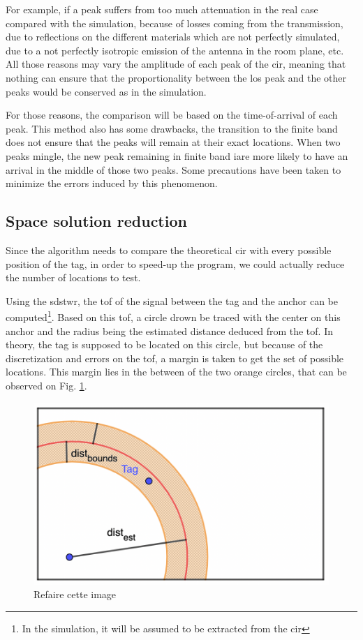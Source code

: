For example, if a peak suffers from too much attenuation in the real case compared with the simulation, because of losses coming from the transmission, due to reflections on the different materials which are not perfectly simulated, due to a not perfectly isotropic emission of the antenna in the room plane, etc. All those reasons may vary the amplitude of each peak of the \gls{cir}, meaning that nothing can ensure that the proportionality between the \gls{los} peak and the other peaks would be conserved as in the simulation.
\vspace{2mm}

For those reasons, the comparison will be based on the time-of-arrival of each peak. This method also has some drawbacks, the transition to the finite band does not ensure that the peaks will remain at their exact locations. When two peaks mingle, the new peak remaining in finite band iare more likely to have an arrival in the middle of those two peaks. Some precautions have been taken to minimize the errors induced by this phenomenon.
\vspace{2mm}

\subsection{Space solution reduction}

Since the algorithm needs to compare the theoretical \gls{cir} with every possible position of the tag, in order to speed-up the program, we could actually reduce the number of locations to test.
\vspace{2mm}

Using the \gls{sdstwr}, the \gls{tof} of the signal between the tag and the anchor can be computed\footnote{In the simulation, it will be assumed to be extracted from the \gls{cir}}. Based on this \gls{tof}, a circle drown be traced with the center on this anchor and the radius being the estimated distance deduced from the \gls{tof}. In theory, the tag is supposed to be located on this circle, but because of the discretization and errors on the \gls{tof}, a margin is taken to get the set of possible locations. This margin lies in the between of the two orange circles, that can be observed on Fig. \ref{fig:speedup_1}.
\vspace{2mm}

\begin{figure}[H]
\centering
\includegraphics[width=.65\linewidth]{Images/algo_1.png}
\caption{\color{red} Refaire cette image \color{black}}
\label{fig:speedup_1}
\end{figure}

